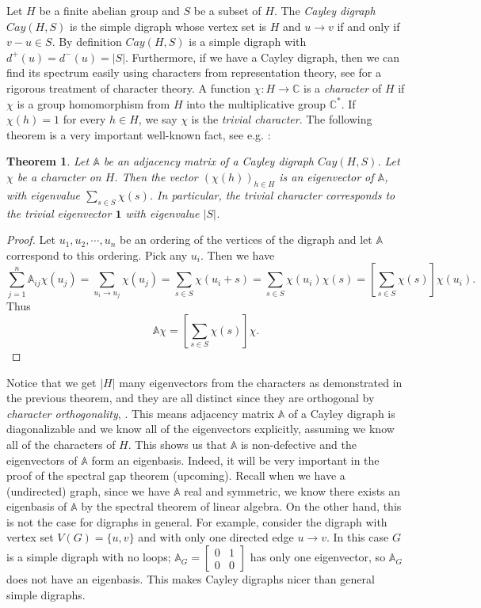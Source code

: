\documentclass[11pt,reqno]{amsart}
\newtheorem{thm}{Theorem}[section]
\begin{document}
Let $H$ be a finite abelian group and $S$ be a subset of $H$. The \emph{Cayley digraph} $Cay(H,S)$ is the simple digraph whose vertex set is $H$ and $u \rightarrow v$ if and only if $v-u \in S$. By definition $Cay(H,S)$ is a simple digraph with $d^{+}(u)=d^{-}(u)=|S|$. Furthermore, if we have a Cayley digraph, then we can find its spectrum easily using characters from representation theory, see \cite{Serre} for a rigorous treatment of character theory. A function $\chi: H \longrightarrow \mathbb{C}$ is a \emph{character} of $H$ if $\chi$ is a group homomorphism from $H$ into the multiplicative group $\mathbb{C}^{\ast}$. If $\chi(h)=1$ for every $h\in H$, we say $\chi$ is the \emph{trivial character}. The following theorem is a very important well-known fact, see e.g. \cite{Brouwer-Spectra}: 
\begin{thm} \label{character theory}
Let $\mathbb{A}$ be an adjacency matrix of a Cayley digraph $Cay(H,S)$. Let $\chi$ be a character on $H$. Then the vector $(\chi(h))_{h \in H}$ is an eigenvector of $\mathbb{A}$, with eigenvalue $\sum_{s \in S} \chi(s)$. In particular, the trivial character corresponds to the trivial eigenvector $\boldsymbol{1}$ with eigenvalue $|S|$.
\end{thm}

\begin{proof} 
Let $u_1,u_2, \cdots, u_n$ be an ordering of the vertices of the digraph and let $\mathbb{A}$ correspond to this ordering. Pick any $u_i$. Then we have \[ \sum_{j=1}^{n} \mathbb{A}_{ij} \chi(u_j)= \sum_{u_{i} \rightarrow u_{j}} \chi(u_{j})=\sum_{s \in S} \chi(u_{i}+s)= \sum_{s \in S} \chi(u_{i})\chi(s)=\left[\sum_{s \in S} \chi(s)\right]\chi(u_{i}).\] Thus \[ \mathbb{A} \chi= \left[\sum_{s \in S} \chi(s)\right] \chi .\]
\end{proof}

Notice that we get $|H|$ many eigenvectors from the characters as demonstrated in the previous theorem, and they are all distinct since they are orthogonal by \emph{character orthogonality}, \cite{Serre}. This means adjacency matrix $\mathbb{A}$ of a Cayley digraph is diagonalizable and we know all of the eigenvectors explicitly, assuming we know all of the characters of $H$. This shows us that $\mathbb{A}$ is non-defective and the eigenvectors of $\mathbb{A}$ form an eigenbasis. Indeed, it will be very important in the proof of the spectral gap theorem (upcoming). Recall when we have a (undirected) graph, since we have $\mathbb{A}$ real and symmetric, we know there exists an eigenbasis of $\mathbb{A}$ by the spectral theorem of linear algebra. On the other hand, this is not the case for digraphs in general. For example, consider the digraph with vertex set $V(G)=\{u,v\}$ and with only one directed edge $u \rightarrow v$. In this case $G$ is a simple digraph with no loops; $\mathbb{A}_{G}=\begin{bmatrix} 0 & 1  \\ 0 & 0 \end{bmatrix}$ has only one eigenvector, so $\mathbb{A}_{G}$ does not have an eigenbasis. This makes Cayley digraphs nicer than general simple digraphs. 
\end{document}
